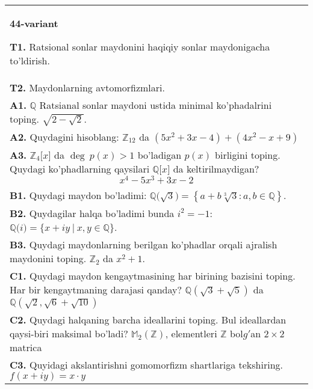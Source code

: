 \documentclass{article}
\begin{document}
\begin{tabular}{m{17cm}}
\textbf{44-variant}
\newline

\textbf{T1.} Ratsional sonlar maydonini haqiqiy sonlar maydonigacha to'ldirish. \\
\textbf{T2.} Maydonlarning avtomorfizmlari. \\
\textbf{A1.} \(\mathbb{Q}\) Ratsianal sonlar maydoni ustida minimal ko'phadalrini toping.
\(\sqrt{2 - \sqrt{2}}\). \\
\textbf{A2.} Quydagini hisoblang:
\(\mathbb{Z}_{12}\) da \(\left( 5x^{2} + 3x - 4 \right) + \left( 4x^{2} - x + 9 \right)\) \\
\textbf{A3.} \(\mathbb{Z}_{4}\lbrack x\rbrack\) da \(\deg\ p(x) > 1\) bo'ladigan \(p(x)\) birligini toping. Quydagi ko'phadlarning qaysilari \(\mathbb{Q\lbrack}x\rbrack\) da keltirilmaydigan?
\[x^{4} - 5x^{3} + 3x - 2\] \\
\textbf{B1.} Quydagi maydon bo'ladimi:
\(\mathbb{Q(}\sqrt{3}) = \left\{ a + b\sqrt[3]{3}:a,b \in \mathbb{Q} \right\}\). \\
\textbf{B2.} Quydagilar halqa bo'ladimi bunda \(i^{2} = - 1\):
\(\mathbb{Q(}i) = \{ x + iy\ |\ x,y \in \mathbb{Q\}}\). \\
\textbf{B3.} Quydagi maydonlarning berilgan ko'phadlar orqali ajralish maydonini toping.
\(\mathbb{Z}_{2}\) da \(x^{2} + 1\). \\
\textbf{C1.} Quydagi maydon kengaytmasining har birining bazisini toping. Har bir kengaytmaning darajasi qanday?
\(\mathbb{Q}\left( \sqrt{3} + \sqrt{5} \right)\) da \(\mathbb{Q}\left( \sqrt{2},\sqrt{6} + \sqrt{10} \right)\) \\
\textbf{C2.} Quydagi halqaning barcha ideallarini toping. Bul ideallardan qaysi-biri maksimal bo'ladi?
\(\mathbb{M}_{2}\left( \mathbb{Z} \right)\), elementleri \(\mathbb{Z}\) bol\(g'\)an \(2 \times 2\) matrica \\
\textbf{C3.} Quyidagi akslantirishni gomomorfizm shartlariga tekshiring. \(f(x + iy) = x \cdot y\) \\

\end{tabular}
\vspace{1cm}
\end{document}
